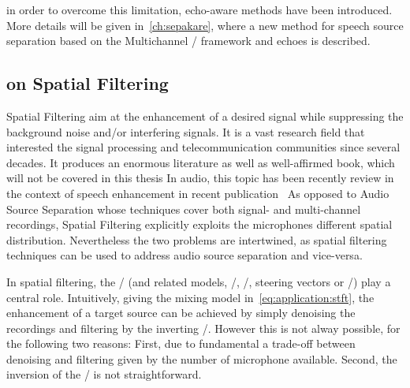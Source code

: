  in order to overcome this limitation, echo-aware methods have been introduced.
More details will be given in~\cref{ch:sepakare}, where a new method for speech source separation based on the Multichannel \NMF/ framework and echoes is described.

\subsection{on Spatial Filtering}
Spatial Filtering aim at the enhancement of a desired signal while suppressing the background noise and/or interfering signals.
It is a vast research field that interested the signal processing and telecommunication communities since several decades.
It produces an enormous literature as well as well-affirmed book, which will not be covered in this thesis
In audio, this topic has been recently review in the context of speech enhancement in recent publication~
As opposed to Audio Source Separation whose techniques cover both signal- and multi-channel recordings, Spatial Filtering explicitly exploits the microphones different spatial distribution.
Nevertheless the two problems are intertwined, as spatial filtering techniques can be used to address audio source separation and vice-versa.

\mynewline
In spatial filtering, the \RIRs/ (and related models, \eg/, \RTFs/, steering vectors or \ReTFs/) play a central role.
Intuitively, giving the mixing model in~\cref{eq:application:stft}, the enhancement of a target source can be achieved by simply denoising the recordings and filtering by the inverting \RIRs/.
However this is not alway possible, for the following two reasons:
First, due to fundamental a trade-off between denoising and filtering given by the number of microphone available.
Second, the inversion of the \RIRs/ is not straightforward.

